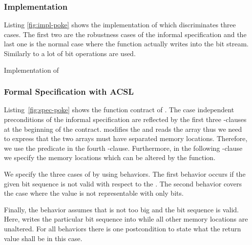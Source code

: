 \subsubsection{Implementation}
\label{sec:impl-poke}
Listing \ref{fig:impl-poke} shows the implementation of \poke
which discriminates three cases. The first two are the robustness cases
of the informal specification and the last one is
the normal case where the function actually writes into the bit stream.
Similarly to \peek a lot of bit operations are used. 

\begin{listing}[hbt]
\begin{minipage}{\textwidth}

\end{minipage}
\caption{\label{fig:impl-poke} Implementation of \poke}
\end{listing}



\clearpage
\subsubsection{Formal Specification with ACSL}
\label{formal-poke}

Listing~\ref{fig:spec-poke} shows the function contract of \poke.
The case independent preconditions of the informal specification 
are reflected by the  first three -clauses at the beginning of the contract.
\poke modifies the  and reads the array
 thus we need to express 
that the two arrays must have separated memory locations. 
Therefore, we use the predicate  in the fourth -clause.
Furthermore, in the following -clause we specify the memory locations which 
can be altered by the function.

We specify the three cases of \poke by using behaviors. 
The first behavior  occurs if the given bit sequence is not valid with respect to the . 
The second behavior  covers the case where the value  
is not representable with only  bits.

Finally, the behavior  assumes 
that  is not too big and the bit sequence is valid. 
Here, \poke writes the particular bit sequence into  
while all other memory locations are unaltered.
For all behaviors there is one postcondition to state what
the return value shall be in this case.


